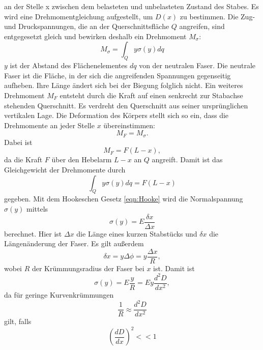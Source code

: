 an der Stelle x zwischen dem belasteten und unbelasteten Zustand des Stabes.
Es wird eine Drehmomentgleichung aufgestellt, um $D(x)$ zu bestimmen.
Die Zug- und Druckspannungen, die an der Querschnittsfläche $Q$ angreifen,
sind entgegesetzt gleich und bewirken deshalb ein Drehmoment $M_{\sigma}$:
\begin{equation*}
M_{\sigma} = \int_{Q} y \sigma(y) dq
\end{equation*}
$y$ ist der Abstand des Flächenelementes $dq$ von der neutralen
Faser. Die neutrale Faser ist die Fläche, in der sich die angreifenden Spannungen gegenseitig aufheben.
Ihre Länge ändert sich bei der Biegung folglich nicht.
Ein weiteres Drehmoment $M_{F}$ entsteht durch die Kraft auf einen senkrecht
zur Stabachse stehenden Querschnitt. Es verdreht den Querschnitt aus 
seiner ursprünglichen vertikalen Lage.
Die Deformation des Körpers stellt sich so ein, dass die Drehmomente an
jeder Stelle $x$ übereinstimmen:
\begin{equation*}
M_{F} = M_{\sigma}.
\end{equation*}
Dabei ist
\begin{equation*}
M_{F} = F (L-x),
\end{equation*}
da die Kraft $F$ über den Hebelarm $L-x$ an $Q$ angreift.
Damit ist das Gleichgewicht der Drehmomente durch
\begin{equation}
\int_{Q} y \sigma(y) dq = F(L-x)
\label{eqn:Momente}
\end{equation}
gegeben.
Mit dem Hookeschen Gesetz \eqref{eqn:Hooke} wird die Normalspannung
$\sigma(y)$ mittels
\begin{equation*}
\sigma(y) = E \frac{\delta x}{\Delta x}
\end{equation*}
berechnet. Hier ist $\Delta x$ die Länge eines kurzen Stabstücks
und $\delta x$ die Längenänderung der Faser.
Es gilt außerdem
\begin{equation*}
\delta x = y \Delta \phi = y \frac{\Delta x}{R},
\end{equation*}
wobei $R$ der Krümmungsradius der Faser bei $x$ ist.
Damit ist
\begin{equation*}
\sigma(y) = E \frac{y}{R} = E y \frac{d^2D}{dx^2},
\end{equation*}
da für geringe Kurvenkrümmungen
\begin{equation*}
\frac{1}{R} \approx \frac{d^2D}{dx^2}
\end{equation*}
gilt, falls
\begin{equation*}
(\frac{dD}{dx})^2 << 1
\end{equation*}
